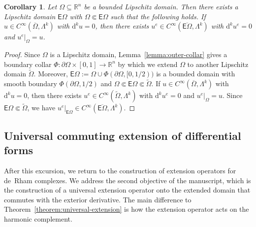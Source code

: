 \documentclass[10pt,a4paper]{amsart}
\newtheorem{corollary}[theorem]{Corollary}
\theoremstyle{definition}
\theoremstyle{remark}
\numberwithin{equation}{section}
\newcommand{\bbR}{{\mathbb R}}
\newcommand{\sfE}{{\mathsf E}}
\newcommand{\closure}{\overline}
\renewcommand{\restriction}{|}
\newcommand{\cartan}{{\mathrm d}}
\newcommand{\Domain}{{\Omega}}
\newcommand{\extDomain}{{\sfE\Omega}}
\newcommand{\collaredDomain}{{\widetilde\Omega}}
\newcommand{\Alt}[1]{\Lambda^{#1}}
\begin{document}
\begin{corollary}\label{corollary:closed-and-bounded-extension}
    Let $\Domain \subseteq \bbR^{n}$ be a bounded Lipschitz domain.
    Then there exists a Lipschitz domain $\extDomain$ with $\Domain \Subset \extDomain$ such that the following holds.
    If $u \in C^{\infty}(\closure\Domain,\Alt{k})$ with $\cartan^{k} u = 0$,
    then there exists $u^{e} \in C^{\infty}(\closure\extDomain,\Alt{k})$ with $\cartan^{k} u^{e} = 0$ and $u^{e} \restriction_{\Domain} = u$.
\end{corollary}
\begin{proof}
    \newcommand{\extextDomain}{{\sfE_{\star}\Domain}}
    Since $\Domain$ is a Lipschitz domain, Lemma~\ref{lemma:outer-collar} gives a boundary collar $\Phi : \partial\Domain \times [0,1] \to \bbR^{n}$
    by which we extend $\Domain$ to another Lipschitz domain $\collaredDomain$. 
    Moreover, $\extDomain := \Domain \cup \Phi(\partial\Domain,[0,1/2))$ is a bounded domain with smooth boundary $\Phi( \partial\Domain, 1/2 )$ and $\Domain \Subset \extDomain \Subset \collaredDomain$. 
    If $u \in C^{\infty}(\closure\Domain,\Alt{k})$ with $\cartan^{k} u = 0$,
    then there exists $u^{e} \in C^{\infty}(\collaredDomain,\Alt{k})$ with $\cartan^{k} u^{e} = 0$ and $u^{e} \restriction_{\Domain} = u$. 
    Since $\extDomain \Subset \collaredDomain$, we have $u^{e} \restriction_{\extDomain} \in C^{\infty}(\closure{\extDomain},\Alt{k})$.
\end{proof}





\subsection{Universal commuting extension of differential forms}

After this excursion, we return to the construction of extension operators for de~Rham complexes. 
We address the second objective of the manuscript, which is the construction of a universal extension operator onto the extended domain that commutes with the exterior derivative. 
The main difference to Theorem~\ref{theorem:universal-extension} is how the extension operator acts on the harmonic complement. 
\end{document}
